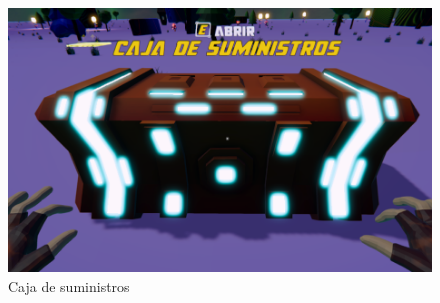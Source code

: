 \begin{figure}[h]
    \centering
    \includegraphics[scale=0.45]{img/Crate.png}
    \caption{Caja de suministros}
    \label{fig:CajaSuministros}
    \end{figure}

